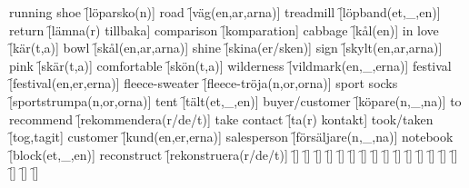 \begin{questions}
\begin{multicols}{2}
        \question running shoe \f[löparsko(n)]
        \question road \f[väg(en,ar,arna)]
        \question treadmill \f[löpband(et,\_,en)]
        \question return \f[lämna(r) tillbaka]
        \question comparison \f[komparation]
        \question cabbage \f[kål(en)]
        \question in love \f[kär(t,a)]
        \question bowl \f[skål(en,ar,arna)]
        \question shine \f[skina(er/sken)]
        \question sign \f[skylt(en,ar,arna)]
        \question pink \f[skär(t,a)]
        \question comfortable \f[skön(t,a)]
        \question wilderness \f[vildmark(en,\_,erna)]
        \question festival \f[festival(en,er,erna)]
        \question fleece-sweater \f[fleece-tröja(n,or,orna)]
        \question sport socks \f[sportstrumpa(n,or,orna)]
        \question tent \f[tält(et,\_,en)]
        \question buyer/customer \f[köpare(n,\_,na)]
        \question to recommend \f[rekommendera(r/de/t)]
        \question take contact \f[ta(r) kontakt]
        \question took/taken \f[tog,tagit]
        \question customer \f[kund(en,er,erna)]
        \question salesperson \f[försäljare(n,\_,na)]
        \question notebook \f[block(et,\_,en)]
        \question reconstruct \f[rekonstruera(r/de/t)]
        \question  \f[]
        \question  \f[]
        \question  \f[]
        \question  \f[]
        \question  \f[]
        \question  \f[]
        \question  \f[]
        \question  \f[]
        \question  \f[]
        \question  \f[]
        \question  \f[]
        \question  \f[]
        \question  \f[]
        \question  \f[]
        \question  \f[]
        \question  \f[]
        \question  \f[]
        \question  \f[]
    \end{multicols}
\end{questions}
